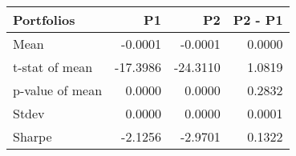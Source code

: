 \begin{tabular}{lrrr}
\toprule
Portfolios & P1 & P2 & P2 - P1 \\
\midrule
Mean & -0.0001 & -0.0001 & 0.0000 \\
t-stat of mean & -17.3986 & -24.3110 & 1.0819 \\
p-value of mean & 0.0000 & 0.0000 & 0.2832 \\
Stdev & 0.0000 & 0.0000 & 0.0001 \\
Sharpe & -2.1256 & -2.9701 & 0.1322 \\
\bottomrule
\end{tabular}
